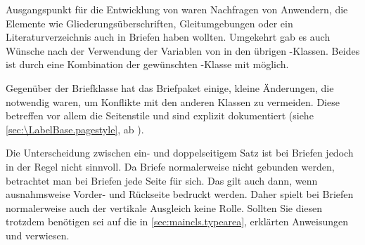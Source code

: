 Ausgangspunkt für die Entwicklung von  waren
Nachfragen von Anwendern, die Elemente wie
Gliederungsüberschriften, Gleitumgebungen oder ein Literaturverzeichnis auch in Briefen
haben wollten. Umgekehrt gab es auch Wünsche nach der Verwendung der Variablen
von  in den übrigen \KOMAScript-Klassen. Beides ist durch eine
Kombination der gewünschten \KOMAScript-Klasse mit 
möglich.

Gegenüber der Briefklasse hat das Briefpaket einige, kleine Änderungen, die
notwendig waren, um Konflikte mit den anderen Klassen zu vermeiden. Diese
betreffen vor allem die Seitenstile und sind explizit dokumentiert (siehe
\autoref{sec:\LabelBase.pagestyle}, ab
). %
%






Die Unterscheidung zwischen ein- und doppelseitigem Satz ist bei Briefen
jedoch in der Regel nicht sinnvoll. Da Briefe normalerweise nicht gebunden
werden, betrachtet man bei Briefen jede Seite für sich. Das gilt auch dann,
wenn ausnahmsweise Vorder- und Rückseite bedruckt werden. Daher spielt bei
Briefen normalerweise auch der vertikale Ausgleich keine Rolle. Sollten Sie
diesen trotzdem benötigen
%
sei auf die in \autoref{sec:maincls.typearea},
 erklärten Anweisungen
 und
 verwiesen.%
%
\EndIndexGroup


